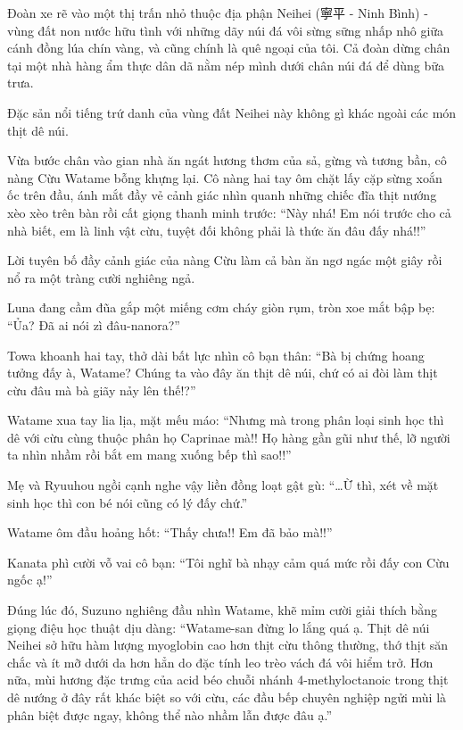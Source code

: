 \documentclass[../main.tex]{subfiles}
\begin{document}
Đoàn xe rẽ vào một thị trấn nhỏ thuộc địa phận Neihei (寧平 - Ninh Bình) - vùng đất non nước hữu tình với những dãy núi đá vôi sừng sững nhấp nhô giữa cánh đồng lúa chín vàng, và cũng chính là quê ngoại của tôi. Cả đoàn dừng chân tại một nhà hàng ẩm thực dân dã nằm nép mình dưới chân núi đá để dùng bữa trưa.

Đặc sản nổi tiếng trứ danh của vùng đất Neihei này không gì khác ngoài các món thịt dê núi.

Vừa bước chân vào gian nhà ăn ngát hương thơm của sả, gừng và tương bần, cô nàng Cừu Watame bỗng khựng lại. Cô nàng hai tay ôm chặt lấy cặp sừng xoắn ốc trên đầu, ánh mắt đầy vẻ cảnh giác nhìn quanh những chiếc đĩa thịt nướng xèo xèo trên bàn rồi cất giọng thanh minh trước: ``Này nhá! Em nói trước cho cả nhà biết, em là linh vật cừu, tuyệt đối không phải là thức ăn đâu đấy nhá!!''

Lời tuyên bố đầy cảnh giác của nàng Cừu làm cả bàn ăn ngơ ngác một giây rồi nổ ra một tràng cười nghiêng ngả.

Luna đang cầm đũa gắp một miếng cơm cháy giòn rụm, tròn xoe mắt bập bẹ: ``Ủa? Đã ai nói zì đâu-nanora?''

Towa khoanh hai tay, thở dài bất lực nhìn cô bạn thân: ``Bà bị chứng hoang tưởng đấy à, Watame? Chúng ta vào đây ăn thịt dê núi, chứ có ai đòi làm thịt cừu đâu mà bà giãy nảy lên thế!?''

Watame xua tay lia lịa, mặt mếu máo: ``Nhưng mà trong phân loại sinh học thì dê với cừu cùng thuộc phân họ Caprinae mà!! Họ hàng gần gũi như thế, lỡ người ta nhìn nhầm rồi bắt em mang xuống bếp thì sao!!''

Mẹ và Ryuuhou ngồi cạnh nghe vậy liền đồng loạt gật gù: ``\dots Ừ thì, xét về mặt sinh học thì con bé nói cũng có lý đấy chứ.''

Watame ôm đầu hoảng hốt: ``Thấy chưa!! Em đã bảo mà!!''

Kanata phì cười vỗ vai cô bạn: ``Tôi nghĩ bà nhạy cảm quá mức rồi đấy con Cừu ngốc ạ!''

Đúng lúc đó, Suzuno nghiêng đầu nhìn Watame, khẽ mỉm cười giải thích bằng giọng điệu học thuật dịu dàng: ``Watame-san đừng lo lắng quá ạ. Thịt dê núi Neihei sở hữu hàm lượng myoglobin cao hơn thịt cừu thông thường, thớ thịt săn chắc và ít mỡ dưới da hơn hẳn do đặc tính leo trèo vách đá vôi hiểm trở. Hơn nữa, mùi hương đặc trưng của acid béo chuỗi nhánh 4-methyloctanoic trong thịt dê nướng ở đây rất khác biệt so với cừu, các đầu bếp chuyên nghiệp ngửi mùi là phân biệt được ngay, không thể nào nhầm lẫn được đâu ạ.''
\end{document}
